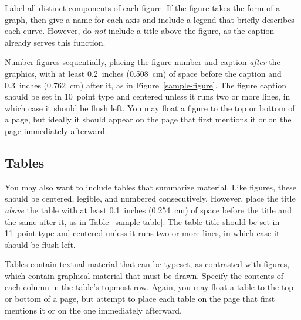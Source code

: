 \documentclass[11pt,letterpaper]{article}
\begin{document}


Label all distinct components of each figure. If the figure takes
the form of a graph, then give a name for each axis and include a 
legend that briefly describes each curve. However, do {\it not\/} 
include a title above the figure, as the caption already serves
this function. 

Number figures sequentially, placing the figure number and caption
{\it after\/} the graphics, with at least 0.2~inches (0.508~cm) of 
space before the caption and 0.3~inches (0.762~cm) after it, as in
Figure~\ref{sample-figure}. The figure caption should be set in
10~point type and centered unless it runs two or more lines, in which
case it should be flush left. You may float a figure to the top or
bottom of a page, but ideally it should appear on the page that
first mentions it or on the page immediately afterward. 

 
\subsection{Tables} 
 
You may also want to include tables that summarize material. Like 
figures, these should be centered, legible, and numbered consecutively. 
However, place the title {\it above\/} the table with at least 
0.1~inches (0.254~cm) of space before the title and the same after 
it, as in Table~\ref{sample-table}. The table title should be set in
11~point type and centered unless it runs two or more lines, in which
case it should be flush left.

Tables contain textual material that can be typeset, as contrasted 
with figures, which contain graphical material that must be drawn. 
Specify the contents of each column in the table's topmost row. Again,
you may float a table to the top or bottom of a page, but attempt to 
place each table on the page that first mentions it or on the one
immediately afterward. 
\end{document}

